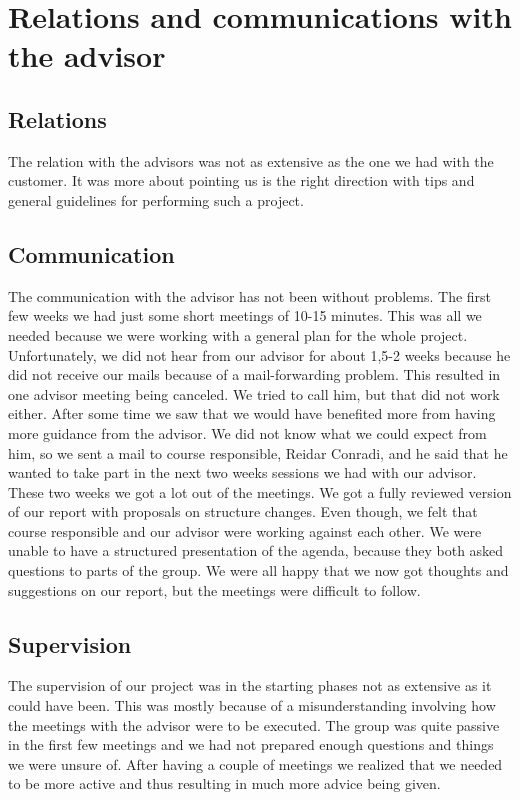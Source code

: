 \section{Relations and communications with the advisor}

\subsection{Relations}
The relation with the advisors was not as extensive as the one we had with the customer. It was more about pointing us is the right direction with tips and general guidelines for performing such a project. 

\subsection{Communication}
The communication with the advisor has not been without problems. The first few weeks we had just some short meetings of 10-15 minutes. This was all we needed because we were working with a general plan for the whole project.
\newline
\newline
Unfortunately, we did not hear from our advisor for about 1,5-2 weeks because he did not receive our mails because of a mail-forwarding problem. This resulted in one advisor meeting being canceled. We tried to call him, but that did not work either.
\newline
\newline
After some time we saw that we would have benefited more from having more guidance from the advisor. We did not know what we could expect from him, so we sent a mail to course responsible, Reidar Conradi, and he said that he wanted to take part in the next two weeks sessions we had with our advisor.
\newline
\newline
These two weeks we got a lot out of the meetings. We got a fully reviewed version of our report with proposals on structure changes. Even though, we felt that course responsible and our advisor were working against each other. We were unable to have a structured presentation of the agenda, because they both asked questions to parts of the group. We were all happy that we now got thoughts and suggestions on our report, but the meetings were difficult to follow.
\newpage
\subsection{Supervision}
The supervision of our project was in the starting phases not as extensive as it could have been. This was mostly because of a misunderstanding involving how the meetings with the advisor were to be executed. The group was quite passive in the first few meetings and we had not prepared enough questions and things we were unsure of. After having a couple of meetings we realized that we needed to be more active and thus resulting in much more advice being given.
